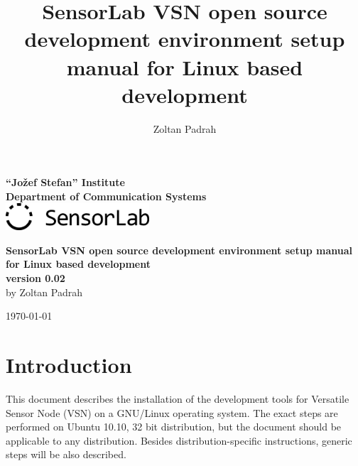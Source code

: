 \documentclass[a4paper, 10pt]{article}
\title{SensorLab VSN open source development environment setup manual for Linux based development}
\author{Zoltan Padrah}
\begin{document}
\begin{titlepage}
    \begin{center}
    \textbf{
        \Large ``Jožef Stefan'' Institute \\[2mm]
        Department of Communication Systems\\[2mm]
        \includegraphics[height=1cm]{./png-install-guide/sensorlab-logo.png}
        }\\

    \vfill

    \textbf{\huge SensorLab VSN open source development environment setup manual
        for Linux based development}\\[1.5cm]


    \textbf{ \Large
    version 0.02}\\[1cm]

    \textnormal{\Large
    by Zoltan Padrah}\\[1cm]

    \vfill

    \textnormal{\large
    \today\\[1cm]
    }
    \end{center}
\end{titlepage}


\section{Introduction}

This document describes the installation of the development tools for
Versatile Sensor Node (VSN) on a GNU/Linux operating system.
The exact steps are performed on Ubuntu 10.10, 32 bit distribution,
but the document should be applicable to any distribution.
Besides distribution-specific instructions,
generic steps will be also described.
\end{document}
